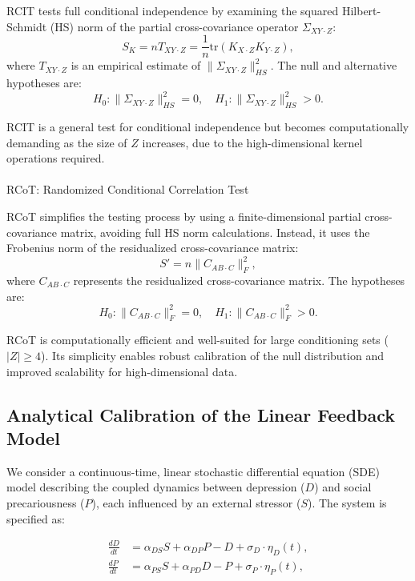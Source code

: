 \documentclass[
]{article}
\makeatletter
\let\oldparagraph\paragraph
\renewcommand{\paragraph}{
    \@ifstar
      \xxxParagraphStar
      \xxxParagraphNoStar
  }
\newcommand{\xxxParagraphStar}[1]{\oldparagraph*{#1}\mbox{}}
\newcommand{\xxxParagraphNoStar}[1]{\oldparagraph{#1}\mbox{}}
\makeatother
\begin{document}
RCIT tests full conditional independence by examining the squared
Hilbert-Schmidt (HS) norm of the partial cross-covariance operator
\(\Sigma_{XY \cdot Z}\): \[
S_K = n T_{XY \cdot Z} = \frac{1}{n} \text{tr}(K_{X \cdot Z} K_{Y \cdot Z}),
\] where \(T_{XY \cdot Z}\) is an empirical estimate of
\(\|\Sigma_{XY \cdot Z}\|^2_{HS}\). The null and alternative hypotheses
are: \[
H_0: \|\Sigma_{XY \cdot Z}\|^2_{HS} = 0, \quad H_1: \|\Sigma_{XY \cdot Z}\|^2_{HS} > 0.
\]

RCIT is a general test for conditional independence but becomes
computationally demanding as the size of \(Z\) increases, due to the
high-dimensional kernel operations required.

\paragraph{RCoT: Randomized Conditional Correlation
Test}\label{rcot-randomized-conditional-correlation-test}

RCoT simplifies the testing process by using a finite-dimensional
partial cross-covariance matrix, avoiding full HS norm calculations.
Instead, it uses the Frobenius norm of the residualized cross-covariance
matrix: \[
S' = n \|C_{AB \cdot C}\|_F^2,
\] where \(C_{AB \cdot C}\) represents the residualized cross-covariance
matrix. The hypotheses are: \[
H_0: \|C_{AB \cdot C}\|_F^2 = 0, \quad H_1: \|C_{AB \cdot C}\|_F^2 > 0.
\]

RCoT is computationally efficient and well-suited for large conditioning
sets (\(|Z| \geq 4\)). Its simplicity enables robust calibration of the
null distribution and improved scalability for high-dimensional data.

\subsection{Analytical Calibration of the Linear Feedback
Model}\label{sec-analcalibration}

We consider a continuous-time, linear stochastic differential equation
(SDE) model describing the coupled dynamics between depression (\(D\))
and social precariousness (\(P\)), each influenced by an external
stressor (\(S\)). The system is specified as:

\[
\begin{aligned}
\frac{dD}{dt} &= \alpha_{DS} S + \alpha_{DP} P - D + \sigma_D \cdot \eta_D(t), \\
\frac{dP}{dt} &= \alpha_{PS} S + \alpha_{PD} D - P + \sigma_P \cdot \eta_P(t),
\end{aligned}
\]
\end{document}
